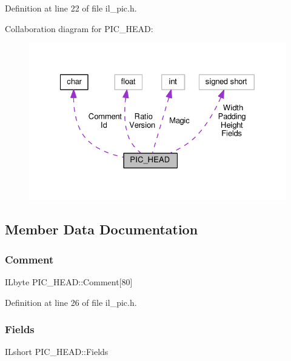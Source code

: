 Definition at line 22 of file il\+\_\+pic.\+h.



Collaboration diagram for P\+I\+C\+\_\+\+H\+E\+AD\+:
\nopagebreak
\begin{figure}[H]
\begin{center}
\leavevmode
\includegraphics[width=327pt]{de/dc2/structPIC__HEAD__coll__graph}
\end{center}
\end{figure}


\subsection{Member Data Documentation}
\mbox{\label{structPIC__HEAD_a1dd52f5adccb0b3fc404706c0c0888fd}} 
\subsubsection{\texorpdfstring{Comment}{Comment}}
{\footnotesize\ttfamily I\+Lbyte P\+I\+C\+\_\+\+H\+E\+A\+D\+::\+Comment\mbox{[}80\mbox{]}}



Definition at line 26 of file il\+\_\+pic.\+h.

\mbox{\label{structPIC__HEAD_adb48c1448cff6faf68dc5d138d968350}} 
\subsubsection{\texorpdfstring{Fields}{Fields}}
{\footnotesize\ttfamily I\+Lshort P\+I\+C\+\_\+\+H\+E\+A\+D\+::\+Fields}



